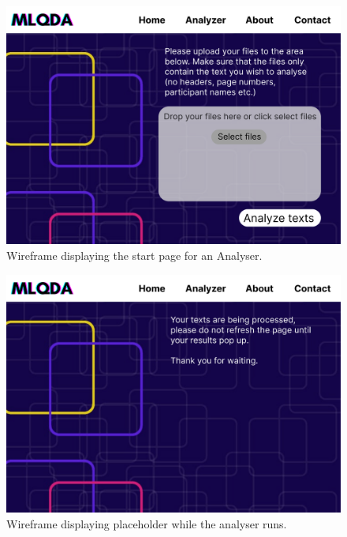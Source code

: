 \documentclass{l4proj}
\begin{document}
\begin{appendices}
\begin{figure}[H]
\centering
    \includegraphics[width=0.95\linewidth]{images/Analyzer (start).png}
    \caption{Wireframe displaying the start page for an Analyser.}
    \label{fig:wireframes_analyser_start} 
\end{figure}

\begin{figure}[H]
\centering
    \includegraphics[width=0.95\linewidth]{images/Analyzer (process).png}
    \caption{Wireframe displaying placeholder while the analyser runs.}
    \label{fig:wireframes_placeholder} 
\end{figure}


\end{appendices}
\end{document}
